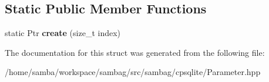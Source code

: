 \subsection*{Static Public Member Functions}
\begin{DoxyCompactItemize}
\item 
\hypertarget{structsambag_1_1cpsqlite_1_1_null_parameter_a2fbf99f0185716dd633c949b720f665c}{
static Ptr {\bfseries create} (size\_\-t index)}
\label{structsambag_1_1cpsqlite_1_1_null_parameter_a2fbf99f0185716dd633c949b720f665c}

\end{DoxyCompactItemize}


The documentation for this struct was generated from the following file:\begin{DoxyCompactItemize}
\item 
/home/samba/workspace/sambag/src/sambag/cpsqlite/Parameter.hpp\end{DoxyCompactItemize}
